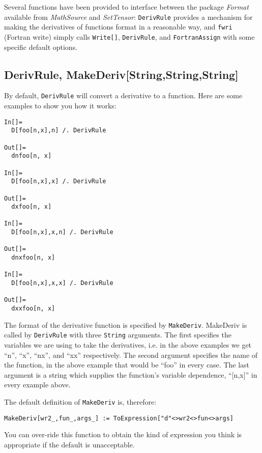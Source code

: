 Several functions have been provided to interface between the package {\it Format}
available from {\it MathSource} and {\it SetTensor}:  {\tt DerivRule} provides a
mechanism for making the derivatives of functions format in a reasonable way, and
{\tt fwri} (Fortran write) simply calls {\tt Write[]}, {\tt DerivRule},
and {\tt FortranAssign} with some specific default options.

\subsection{DerivRule, MakeDeriv[String,String,String]}
By default, {\tt DerivRule} will convert a derivative to a function.
Here are some examples to show you how it works:
\begin{verbatim}
In[]=
  D[foo[n,x],n] /. DerivRule

Out[]=
  dnfoo[n, x]

In[]=
  D[foo[n,x],x] /. DerivRule

Out[]=
  dxfoo[n, x]

In[]=
  D[foo[n,x],x,n] /. DerivRule

Out[]=
  dnxfoo[n, x]

In[]=
  D[foo[n,x],x,x] /. DerivRule

Out[]=
  dxxfoo[n, x]
\end{verbatim}
The format of the derivative function is specified by {\tt MakeDeriv}.
MakeDeriv is called by {\tt DerivRule} with three {\tt String}
arguments.  The first specifies the variables we are using to take the
derivatives, i.e. in the above examples we get ``n'', ``x'', ``nx'',
and ``xx'' respectively.  The second argument specifies the name of
the function, in the above example that would be ``foo'' in every
case.  The last argument is a string which supplies the function's
variable dependence, ``[n,x]'' in every example above.

The default definition of {\tt MakeDeriv} is, therefore:
\begin{verbatim}
MakeDeriv[wr2_,fun_,args_] := ToExpression["d"<>wr2<>fun<>args]
\end{verbatim}

You can over-ride this function to obtain the kind of expression you
think is appropriate if the default is unacceptable.

